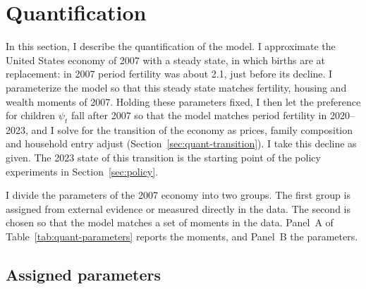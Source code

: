 
\section{Quantification}
\label{sec:quant}

In this section, I describe the quantification of the model. I approximate
the United States economy of 2007 with a steady state, in which births are at
replacement: in 2007 period fertility was about 2.1, just before its decline.
I parameterize the model so that this steady state matches fertility, housing
and wealth moments of 2007. Holding these parameters fixed, I then let the
preference for children $\psi_t$ fall after 2007 so that the model matches
period fertility in 2020--2023, and I solve for the transition of the economy
as prices, family composition and household entry adjust
(Section~\ref{sec:quant-transition}). I take this decline as given. The 2023
state of this transition is the starting point of the policy experiments in
Section~\ref{sec:policy}.

I divide the parameters of the 2007 economy into two groups. The first
group is assigned from external evidence or measured directly in the data.
The second is chosen so that the model matches a set of moments in the data.
Panel~A of Table~\ref{tab:quant-parameters} reports the moments, and Panel~B
the parameters.

\subsection{Assigned parameters}
\label{sec:quant-data}
\label{sec:quant-period}

